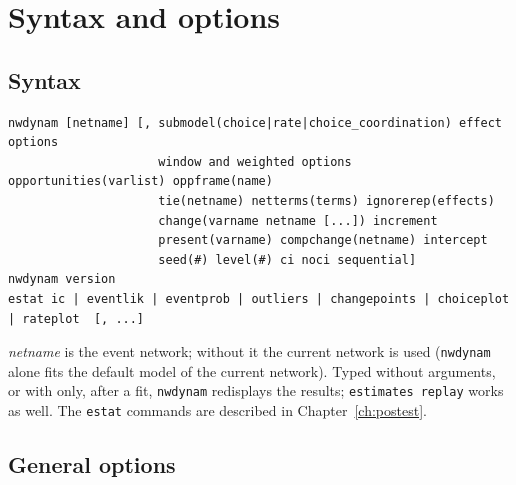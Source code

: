 \chapter{Syntax and options}\label{ch:options}

\section{Syntax}

\begin{lstlisting}
nwdynam [netname] [, submodel(choice|rate|choice_coordination) effect options
                     window and weighted options opportunities(varlist) oppframe(name)
                     tie(netname) netterms(terms) ignorerep(effects)
                     change(varname netname [...]) increment
                     present(varname) compchange(netname) intercept
                     seed(#) level(#) ci noci sequential]
nwdynam version
estat ic | eventlik | eventprob | outliers | changepoints | choiceplot | rateplot  [, ...]
\end{lstlisting}
\emph{netname} is the event network; without it the current network is used (\texttt{nwdynam} alone fits the default model of the current network). Typed without arguments, or with  only, after a fit, \texttt{nwdynam} redisplays the results; \texttt{estimates replay} works as well. The \texttt{estat} commands are described in Chapter~\ref{ch:postest}.

\section{General options}


